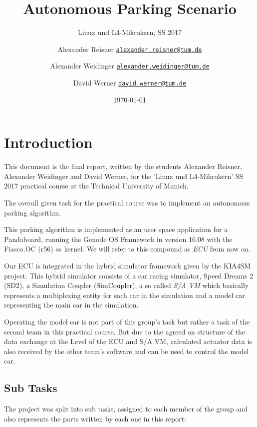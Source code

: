 \documentclass[paper=a4, fontsize=11pt]{scrreprt}
\title{Autonomous Parking Scenario}
\subtitle{Linux und L4-Mikrokern, SS 2017}
\author{Alexander Reisner \href{mailto:alexander.reisner@tum.de}{\texttt{alexander.reisner@tum.de}} \and
Alexander Weidinger \href{mailto:alexander.weidinger@tum.de}{\texttt{alexander.weidinger@tum.de}} \and
David Werner \href{mailto:david.werner@tum.de}{\texttt{david.werner@tum.de}}}
\date{\today}
\begin{document}
\maketitle
\newpage

\tableofcontents
\newpage

\chapter{Introduction}
This document is the final report, written by the students Alexander Reisner,
Alexander Weidinger and David Werner, for the 'Linux und L4-Mikrokern' SS 2017 practical course at the Technical University of Munich.

The overall given task for the practical course was to implement an autonomous parking algorithm.

This parking algorithm is implemented as an user space application for a Pandaboard,
running the Genode OS Framework in version 16.08 with the Fiasco.OC (r56) as kernel.
We will refer to this compound as \textit{ECU} from now on.

Our ECU is integrated in the hybrid simulator framework given by the KIA4SM project.
This hybrid simulator consists of a car racing simulator, Speed Dreams 2 (SD2),
a Simulation Coupler (SimCoupler), a so called \textit{S/A VM} which basically represents a multiplexing entity for each car in the simulation
and a model car representing the main car in the simulation.

Operating the model car is not part of this group's task but rather a task of the second team in this practical course.
But due to the agreed on structure of the data exchange at the Level of the ECU and S/A VM,
calculated actuator data is also received by the other team's software and can be used to control the model car.

\section{Sub Tasks}
The project was split into sub tasks, assigned to each member of the group
and also represents the parts written by each one in this report:
\end{document}
